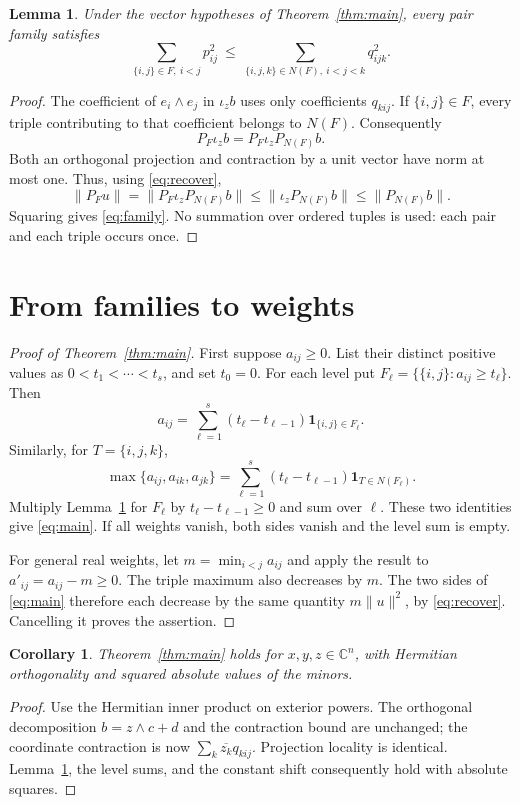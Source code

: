 \documentclass[11pt]{article}
\newtheorem{lemma}[theorem]{Lemma}
\newtheorem{corollary}[theorem]{Corollary}
\newcommand{\C}{\mathbb{C}}
\newcommand{\ii}{\iota_z}
\begin{document}
\begin{lemma}\label{lem:family}
Under the vector hypotheses of Theorem~\ref{thm:main}, every pair family satisfies
\begin{equation}\label{eq:family}
 \sum_{\{i,j\}\in F,\ i<j}p_{ij}^2
 \ \le\ \sum_{\{i,j,k\}\in N(F),\ i<j<k}q_{ijk}^2.
\end{equation}
\end{lemma}
\begin{proof}
The coefficient of $e_i\wedge e_j$ in $\ii b$ uses only coefficients
$q_{kij}$. If $\{i,j\}\in F$, every triple contributing to that coefficient
belongs to $N(F)$. Consequently
\[
 P_F\ii b=P_F\ii P_{N(F)}b.
\]
Both an orthogonal projection and contraction by a unit vector have norm
at most one. Thus, using \eqref{eq:recover},
\[
 \|P_Fu\|=\|P_F\ii P_{N(F)}b\|
 \le\|\ii P_{N(F)}b\|\le\|P_{N(F)}b\|.
\]
Squaring gives \eqref{eq:family}. No summation over ordered tuples is used:
each pair and each triple occurs once.
\end{proof}

\section{From families to weights}
\begin{proof}[Proof of Theorem~\ref{thm:main}]
First suppose $a_{ij}\ge0$. List their distinct positive values as
$0<t_1<\cdots<t_s$, and set $t_0=0$. For each level put
$F_\ell=\{\{i,j\}:a_{ij}\ge t_\ell\}$. Then
\[
 a_{ij}=\sum_{\ell=1}^s(t_\ell-t_{\ell-1})
                 \mathbf1_{\{i,j\}\in F_\ell}.
\]
Similarly, for $T=\{i,j,k\}$,
\[
 \max\{a_{ij},a_{ik},a_{jk}\}
 =\sum_{\ell=1}^s(t_\ell-t_{\ell-1})\mathbf1_{T\in N(F_\ell)}.
\]
Multiply Lemma~\ref{lem:family} for $F_\ell$ by
$t_\ell-t_{\ell-1}\ge0$ and sum over $\ell$. These two identities give
\eqref{eq:main}. If all weights vanish, both sides vanish and the level
sum is empty.

For general real weights, let $m=\min_{i<j}a_{ij}$ and apply the result to
$a'_{ij}=a_{ij}-m\ge0$. The triple maximum also decreases by $m$.
The two sides of \eqref{eq:main} therefore each decrease by the same
quantity $m\|u\|^2$, by \eqref{eq:recover}. Cancelling it proves the assertion.
\end{proof}

\begin{corollary}\label{cor:complex}
Theorem~\ref{thm:main} holds for $x,y,z\in\C^n$, with Hermitian
orthogonality and squared absolute values of the minors.
\end{corollary}
\begin{proof}
Use the Hermitian inner product on exterior powers. The orthogonal
decomposition $b=z\wedge c+d$ and the contraction bound are unchanged;
the coordinate contraction is now $\sum_k\overline{z_k}q_{kij}$.
Projection locality is identical. Lemma~\ref{lem:family}, the level sums,
and the constant shift consequently hold with absolute squares.
\end{proof}
\end{document}
